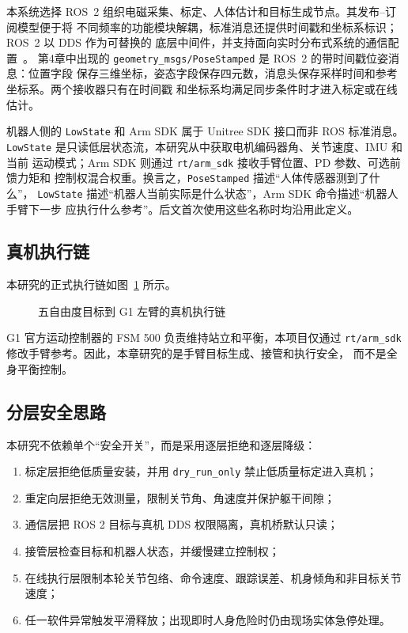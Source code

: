 本系统选择 ROS~2 组织电磁采集、标定、人体估计和目标生成节点。其发布--订阅模型便于将
不同频率的功能模块解耦，标准消息还提供时间戳和坐标系标识；ROS~2 以 DDS 作为可替换的
底层中间件，并支持面向实时分布式系统的通信配置~\cite{maruyama2016ros2,omg2015dds}。
第4章中出现的 \texttt{geometry\_msgs/PoseStamped} 是 ROS~2 的带时间戳位姿消息：位置字段
保存三维坐标，姿态字段保存四元数，消息头保存采样时间和参考坐标系。两个接收器只有在时间戳
和坐标系均满足同步条件时才进入标定或在线估计。

机器人侧的 \texttt{LowState} 和 Arm SDK 属于 Unitree SDK 接口而非 ROS 标准消息。
\texttt{LowState} 是只读低层状态流，本研究从中获取电机编码器角、关节速度、IMU 和当前
运动模式；Arm SDK 则通过 \texttt{rt/arm\_sdk} 接收手臂位置、PD 参数、可选前馈力矩和
控制权混合权重。换言之，\texttt{PoseStamped} 描述“人体传感器测到了什么”，
\texttt{LowState} 描述“机器人当前实际是什么状态”，Arm SDK 命令描述“机器人手臂下一步
应执行什么参考”。后文首次使用这些名称时均沿用此定义。

\subsection{真机执行链}
\label{subsec:ch5_real_execution_path}

本研究的正式执行链如图~\ref{fig:ch5_system_paths} 所示。
\begin{figure}[htbp]
  \centering
  \caption{五自由度目标到 G1 左臂的真机执行链}
  \label{fig:ch5_system_paths}
\end{figure}

G1 官方运动控制器的 FSM 500 负责维持站立和平衡，本项目仅通过
\texttt{rt/arm\_sdk} 修改手臂参考。因此，本章研究的是手臂目标生成、接管和执行安全，
而不是全身平衡控制。

\subsection{分层安全思路}
\label{subsec:ch5_layered_safety}

本研究不依赖单个“安全开关”，而是采用逐层拒绝和逐层降级：
\begin{enumerate}[label=\arabic*)]
  \item 标定层拒绝低质量安装，并用 \texttt{dry\_run\_only} 禁止低质量标定进入真机；
  \item 重定向层拒绝无效测量，限制关节角、角速度并保护躯干间隙；
  \item 通信层把 ROS 2 目标与真机 DDS 权限隔离，真机桥默认只读；
  \item 接管层检查目标和机器人状态，并缓慢建立控制权；
  \item 在线执行层限制本轮关节包络、命令速度、跟踪误差、机身倾角和非目标关节速度；
  \item 任一软件异常触发平滑释放；出现即时人身危险时仍由现场实体急停处理。
\end{enumerate}

